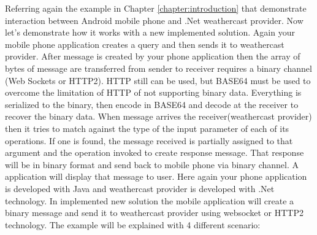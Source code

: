 

Referring again the example in Chapter \ref{chapter:introduction} that demonstrate interaction between Android mobile phone and .Net weathercast provider. Now let's demonstrate how it works with a new implemented solution. Again your mobile phone application creates a query and then sends it to weathercast provider. After message is created by your phone application then the array of bytes of message are transferred from sender to receiver requires a binary channel (Web Sockets or HTTP2). HTTP still can be used, but BASE64 must be used to overcome the limitation of HTTP of not supporting binary data. Everything is serialized to the binary, then encode in BASE64 and decode at the receiver to recover the binary data. When message arrives the receiver(weathercast provider) then it tries to match against the type of the input parameter of each of its operations. If one is found, the message received is partially assigned to that argument and the operation invoked to create response message. That response will be in binary format and send back to mobile phone via binary channel. A application will display that message to user. Here again your phone application is developed with Java and weathercast provider is developed with .Net technology. In implemented new solution the mobile application will create a binary message and send it to weathercast provider using websocket or HTTP2 technology. The example will be explained with 4 different scenario:

